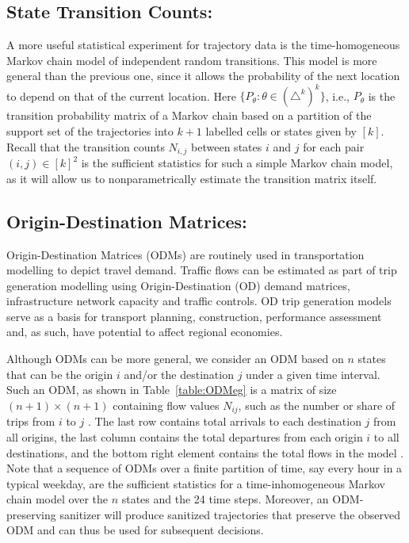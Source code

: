 \documentclass[times,twocolumn,final,authoryear]{elsarticle}
\begin{document}
\subsection{State Transition Counts:}
A more useful statistical experiment for trajectory data is the time-homogeneous Markov chain model of independent random transitions. This model is more general than the previous one, since it allows the probability of the next location to depend on that of the current location.   
Here $\{P_{\theta}: \theta \in (\triangle^k)^k\}$, i.e., $P_{\theta}$ is the transition probability matrix of a Markov chain based on a partition of the support set of the trajectories into $k+1$ labelled cells or states given by $[k]$.  
Recall that the transition counts $N_{i,j}$ between states $i$ and $j$ for each pair $(i,j) \in [k]^2$ is the sufficient statistics for such a simple Markov chain model, as it will allow us to nonparametrically estimate the transition matrix itself.  

\subsection{Origin-Destination Matrices:}
Origin-Destination Matrices (ODMs) are routinely used in transportation modelling to depict travel demand.  
Traffic flows can be estimated as part of trip generation modelling using Origin-Destination (OD) demand matrices, infrastructure network capacity and traffic controls. 
OD trip generation models serve as a basis for transport planning, construction, performance assessment and, as such, have potential to affect regional economies. 

Although ODMs can be more general, we consider an ODM based on $n$ states that can be the origin $i$ and/or the destination $j$ under a given time interval. 
Such an ODM, as shown in Table~\ref{table:ODMeg} is a matrix of size $(n+1) \times (n+1)$ containing flow values $N_{ij}$, such as the number or share of trips from $i$ to $j$ \citep{Rodrigue2009}.  
The last row contains total arrivals to each destination $j$ from all origins, the last column contains the total departures from each origin $i$ to all destinations, and the bottom right element contains the total flows in the model 
\citep{EVANS1970}. 
Note that a sequence of ODMs over a finite partition of time, say every hour in a typical weekday, are the sufficient statistics for a time-inhomogeneous Markov chain model over the $n$ states and the 24 time steps. 
Moreover, an ODM-preserving sanitizer will produce sanitized trajectories that preserve the observed ODM and can thus be used for subsequent decisions.
\end{document}
